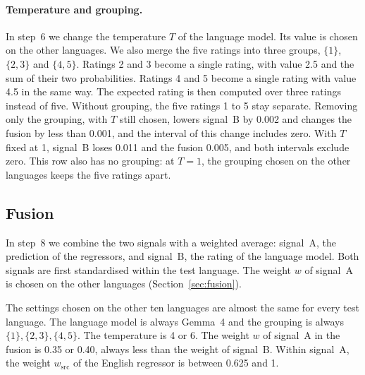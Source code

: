 \paragraph{Temperature and grouping.} In step~6 we change the temperature $T$ of the language %
model. Its value is chosen on the other languages. We also merge the five ratings into three groups, %
$\{1\}$, $\{2, 3\}$ and $\{4, 5\}$. Ratings 2 and 3
become a single rating, with value 2.5 and the sum of their two probabilities. Ratings 4 and 5
become a single rating with value 4.5 in the same way. The expected rating is then computed over
three ratings instead of five. Without grouping, the five ratings 1 to 5 stay separate. Removing only the grouping, with $T$ still chosen, lowers signal~B by %
0.002 and changes the fusion by less than 0.001, and the interval of this change includes zero.
With $T$ fixed at 1, signal~B loses 0.011 and the fusion 0.005, and both intervals exclude zero. %
This row also has no grouping: at $T = 1$, the grouping chosen on the other languages keeps the %
five ratings apart.

\subsection{Fusion}
\label{sec:results-fusion}

In step~8 we combine the two signals with a weighted average: signal~A, the prediction of the %
regressors, and signal~B, the rating of the language model. Both signals are first standardised
within the test language. The weight $w$ of signal~A is chosen on the other languages
(Section~\ref{sec:fusion}).

The settings chosen on the other ten languages are almost the same for every test language. The %
language model is always Gemma~4 and the grouping is always $\{1\}, \{2, 3\}, \{4, 5\}$. The
temperature is 4 or 6. The weight $w$ of signal~A in the fusion is 0.35 or 0.40, always %
less than the weight of signal~B. Within signal~A, the weight $w_{\mathrm{src}}$ of the English %
regressor is between 0.625 and 1.


